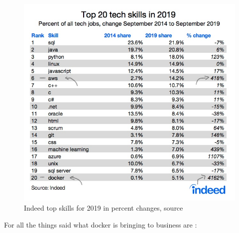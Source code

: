 \documentclass[
  12pt,
  a4paper,
  oneside]{book}
\theoremstyle{definition}
\theoremstyle{definition}
\theoremstyle{definition}
\theoremstyle{remark}
\begin{document}
\begin{figure}
\centering
\includegraphics{images/Inkedindeed_jobs_LI.jpg}
\caption{\label{fig:indeedstats}Indeed top skills for 2019 in percent changes, \citet{top_tech_skills} source}
\end{figure}

For all the things said what docker is bringing to business are \citep{red_hat_customer_portal}:
\end{document}
